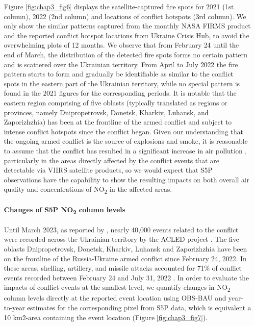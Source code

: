 Figure \ref{fig:chap3_fig6} displays the satellite-captured fire spots for 2021 (1st column), 2022 (2nd column) and locations of conflict hotspots (3rd column). We only show the similar patterns captured from the monthly NASA FIRMS product and the reported conflict hotspot locations from Ukraine Crisis Hub, to avoid the overwhelming plots of 12 months. We observe that from February 24 until the end of March, the distribution of the detected fire spots forms no certain pattern and is scattered over the Ukrainian territory. From April to July 2022 the fire pattern starts to form and gradually be identifiable as similar to the conflict spots in the eastern part of the Ukrainian territory, while no special pattern is found in the 2021 figures for the corresponding periods. It is notable that the eastern region comprising of five oblasts (typically translated as regions or provinces, namely Dnipropetrovsk, Donetsk, Kharkiv, Luhansk, and Zaporizhzhia) has been at the frontline of the armed conflict and subject to intense conflict hotspots since the conflict began. Given our understanding that the ongoing armed conflict is the source of explosions and smoke, it is reasonable to assume that the conflict has resulted in a significant increase in air pollution \citep{pereira2022russian}, particularly in the areas directly affected by the conflict events that are detectable via VIIRS satellite products, so we would expect that S5P observations have the capability to show the resulting impacts on both overall air quality and concentrations of NO\textsubscript{2} in the affected areas.\par
\paragraph*{Changes of S5P NO\textsubscript{2} column levels}
Until March 2023, as reported by \citep{nichita2023}, nearly 40,000 events related to the conflict were recorded across the Ukrainian territory by the ACLED project \citep{raleigh2010introducing}. The five oblasts Dnipropetrovsk, Donetsk, Kharkiv, Luhansk and Zaporizhzhia have been on the frontline of the Russia-Ukraine armed conflict since February 24, 2022. In these areas, shelling, artillery, and missile attacks accounted for 71\% of conflict events recorded between February 24 and July 31, 2022 \citep{nichita2023}. In order to evaluate the impacts of conflict events at the smallest level, we quantify changes in NO\textsubscript{2} column levels directly at the reported event location using OBS-BAU and year-to-year estimates for the corresponding pixel from S5P data, which is equivalent a 10 km2-area containing the event location (Figure \ref{fig:chap3_fig7}). \par

